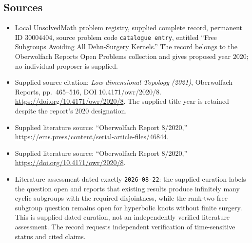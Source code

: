 \documentclass[11pt]{article}
\begin{document}
\subsection{Sources}
\begin{itemize}
\item Local UnsolvedMath problem registry, supplied complete record, permanent ID \(30004404\), source problem code \texttt{catalogue entry}, entitled ``Free Subgroups Avoiding All Dehn-Surgery Kernels.'' The record belongs to the Oberwolfach Reports Open Problems collection and gives proposed year 2020; no individual proposer is supplied.
\item Supplied source citation: \emph{Low-dimensional Topology (2021)}, Oberwolfach Reports, pp.\ 465--516, DOI 10.4171/owr/2020/8. \url{https://doi.org/10.4171/owr/2020/8}. The supplied title year is retained despite the report's 2020 designation.
\item Supplied literature source: ``Oberwolfach Report 8/2020,'' \url{https://ems.press/content/serial-article-files/46844}.
\item Supplied literature source: ``Oberwolfach Report 8/2020,'' \url{https://doi.org/10.4171/owr/2020/8}.
\item Literature assessment dated exactly \texttt{2026-08-22}: the supplied curation labels the question open and reports that existing results produce infinitely many cyclic subgroups with the required disjointness, while the rank-two free subgroup question remains open for hyperbolic knots without finite surgery. This is supplied dated curation, not an independently verified literature assessment. The record requests independent verification of time-sensitive status and cited claims.
\end{itemize}
\end{document}
